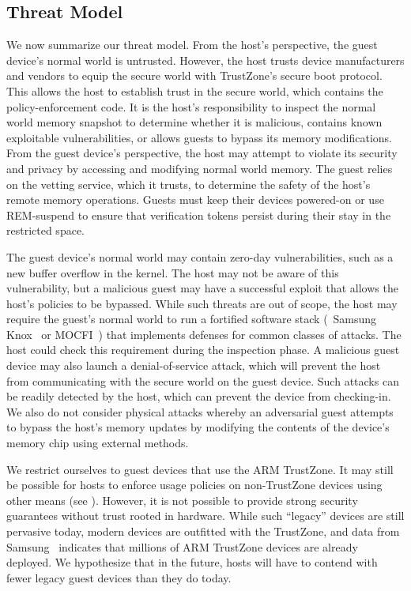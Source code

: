 \subsection{Threat Model} 
\label{section:threat}
%
We now summarize our threat model. From the host's perspective, the guest
device's normal world is untrusted. However, the host trusts device
manufacturers and vendors to equip the secure world with TrustZone's secure
boot protocol. This allows the host to establish trust in the secure world,
which contains the policy-enforcement code. It is the host's responsibility to
inspect the normal world memory snapshot to determine whether it is malicious,
contains known exploitable vulnerabilities, or allows guests to bypass its
memory modifications.  From the guest device's perspective, the host may
attempt to violate its security and privacy by accessing and modifying normal
world memory. The guest relies on the vetting service, which it trusts, to
determine the safety of the host's remote memory operations. Guests must keep
their devices powered-on or use REM-suspend to ensure that verification
tokens persist during their stay in the restricted space.

 The guest device's normal world may contain zero-day
vulnerabilities, such as a new buffer overflow in the kernel.  The host may not
be aware of this vulnerability, but a malicious guest may have a successful
exploit that allows the host's policies to be bypassed. While such threats are
out of scope, the host may require the guest's normal world to run a fortified
software stack (\eg~Samsung Knox~\cite{knox:ccs14} or
MOCFI~\cite{mocfi:ndss12}) that implements defenses for common classes of
attacks. The host could check this requirement during the inspection phase. A
malicious guest device may also launch a denial-of-service attack, which will
prevent the host from communicating with the secure world on the guest device.
Such attacks can be readily detected by the host, which can prevent the device
from checking-in. We also do not consider physical attacks whereby an
adversarial guest attempts to bypass the host's memory updates by modifying the
contents of the device's memory chip using external methods.

We restrict ourselves to guest devices that use the ARM TrustZone. It may still
be possible for hosts to enforce usage policies on non-TrustZone devices using
other means (see ). However, it is not possible to
provide strong security guarantees without trust rooted in hardware. While such
``legacy'' devices are still pervasive today, modern devices are outfitted with
the TrustZone, and data from Samsung~\cite{knox:ccs14} indicates that millions
of ARM TrustZone devices are already deployed. We hypothesize that in the
future, hosts will have to contend with fewer legacy guest devices than they do
today.

